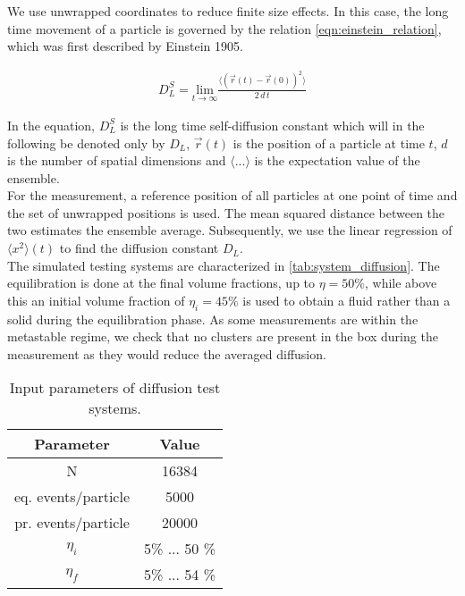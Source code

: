 We use unwrapped coordinates to reduce finite size effects. In this case, the long time movement of a particle is governed by the relation \autoref{eqn:einstein_relation}, which was first described by Einstein 1905\cite{Albert1905}.

\begin{align}
\label{eqn:einstein_relation}
D^S_L = \underset{t\rightarrow \infty}{\text{lim}} \frac{\langle (\vec{r}(t) - \vec{r}(0) )^2 \rangle}{ 2 \, d \, t}
\end{align}

In the equation, $D^S_L$ is the long time self-diffusion constant which will in the following be denoted only by $D_L$, $\vec{r}(t)$ is the position of a particle at time $t$, $d$ is the number of spatial dimensions and $\langle ... \rangle$ is the expectation value of the ensemble.\\

For the measurement, a reference position of all particles at one point of time and the set of unwrapped positions is used. The mean squared distance between the two estimates the ensemble average. Subsequently, we use the linear regression of $\langle x^2 \rangle (t)$ to find the diffusion constant $D_L$.\\

The simulated testing systems are characterized in \autoref{tab:system_diffusion}. The equilibration  is done at the final volume fractions, up to $\eta = 50\%$, while above this an initial volume fraction of $\eta_i = 45\%$ is used to obtain a fluid rather than a solid during the equilibration phase. As some measurements are within the metastable regime, we check that no clusters are present in the box during the measurement as they would reduce the averaged diffusion.\\

\begin{table}[h]
\centering
\begin{tabular}{c|c}
Parameter & Value \\ \hline
N & 16384 \\
eq. events/particle & 5000 \\
pr. events/particle & 20000 \\
$\eta_i$ & 5\% ... 50 \% \\
$\eta_f$ & 5\% ... 54 \% \\
\end{tabular}
\caption[Simulation parameters for diffusion measurement]{Input parameters of diffusion test systems.}
\label{tab:system_diffusion}
\end{table}

